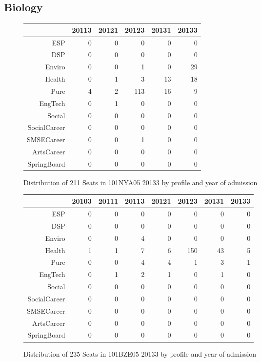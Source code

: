 \documentclass{article}\usepackage[]{graphicx}\usepackage[]{color}
\begin{document}
\subsection{Biology}
\begin{figure}[H]
\centering
\begin{tabular}{rrrrrr}
  \hline
 & 20113 & 20121 & 20123 & 20131 & 20133 \\ 
  \hline
ESP &   0 &   0 &   0 &   0 &   0 \\ 
  DSP &   0 &   0 &   0 &   0 &   0 \\ 
  Enviro &   0 &   0 &   1 &   0 &  29 \\ 
  Health &   0 &   1 &   3 &  13 &  18 \\ 
  Pure &   4 &   2 & 113 &  16 &   9 \\ 
  EngTech &   0 &   1 &   0 &   0 &   0 \\ 
  Social &   0 &   0 &   0 &   0 &   0 \\ 
  SocialCareer &   0 &   0 &   0 &   0 &   0 \\ 
  SMSECareer &   0 &   0 &   1 &   0 &   0 \\ 
  ArtsCareer &   0 &   0 &   0 &   0 &   0 \\ 
  SpringBoard &   0 &   0 &   0 &   0 &   0 \\ 
   \hline
\end{tabular}
\caption{Distribution of 211 Seats in 101NYA05 20133 by profile and year of admission} 
\end{figure}
\begin{figure}[H]
\centering
\begin{tabular}{rrrrrrrr}
  \hline
 & 20103 & 20111 & 20113 & 20121 & 20123 & 20131 & 20133 \\ 
  \hline
ESP &   0 &   0 &   0 &   0 &   0 &   0 &   0 \\ 
  DSP &   0 &   0 &   0 &   0 &   0 &   0 &   0 \\ 
  Enviro &   0 &   0 &   4 &   0 &   0 &   0 &   0 \\ 
  Health &   1 &   1 &   7 &   6 & 150 &  43 &   5 \\ 
  Pure &   0 &   0 &   4 &   4 &   1 &   3 &   1 \\ 
  EngTech &   0 &   1 &   2 &   1 &   0 &   1 &   0 \\ 
  Social &   0 &   0 &   0 &   0 &   0 &   0 &   0 \\ 
  SocialCareer &   0 &   0 &   0 &   0 &   0 &   0 &   0 \\ 
  SMSECareer &   0 &   0 &   0 &   0 &   0 &   0 &   0 \\ 
  ArtsCareer &   0 &   0 &   0 &   0 &   0 &   0 &   0 \\ 
  SpringBoard &   0 &   0 &   0 &   0 &   0 &   0 &   0 \\ 
   \hline
\end{tabular}
\caption{Distribution of 235 Seats in 101BZE05 20133 by profile and year of admission} 
\end{figure}
\end{document}
